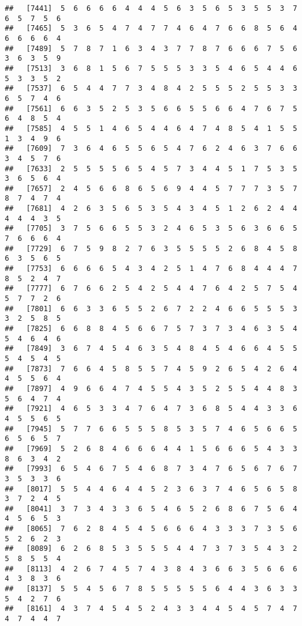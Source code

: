 \documentclass[
]{book}
\begin{document}
\begin{verbatim}
##   [7441]  5  6  6  6  6  4  4  4  5  6  3  5  6  5  3  5  5  3  7  6  5  7  5  6
##   [7465]  5  3  6  5  4  7  4  7  7  4  6  4  7  6  6  8  5  6  4  6  6  6  6  4
##   [7489]  5  7  8  7  1  6  3  4  3  7  7  8  7  6  6  6  7  5  6  3  6  3  5  9
##   [7513]  3  6  8  1  5  6  7  5  5  5  3  3  5  4  6  5  4  4  6  5  3  3  5  2
##   [7537]  6  5  4  4  7  7  3  4  8  4  2  5  5  5  2  5  5  3  3  6  5  7  4  6
##   [7561]  6  6  3  5  2  5  3  5  6  6  5  5  6  6  4  7  6  7  5  6  4  8  5  4
##   [7585]  4  5  5  1  4  6  5  4  4  6  4  7  4  8  5  4  1  5  5  1  3  4  9  6
##   [7609]  7  3  6  4  6  5  5  6  5  4  7  6  2  4  6  3  7  6  6  3  4  5  7  6
##   [7633]  2  5  5  5  5  6  5  4  5  7  3  4  4  5  1  7  5  3  5  3  6  5  6  4
##   [7657]  2  4  5  6  6  8  6  5  6  9  4  4  5  7  7  7  3  5  7  8  7  4  7  4
##   [7681]  4  2  6  3  5  6  5  3  5  4  3  4  5  1  2  6  2  4  4  4  4  4  3  5
##   [7705]  3  7  5  6  6  5  5  3  2  4  6  5  3  5  6  3  6  6  5  7  6  6  6  4
##   [7729]  6  7  5  9  8  2  7  6  3  5  5  5  5  2  6  8  4  5  8  6  3  5  6  5
##   [7753]  6  6  6  6  5  4  3  4  2  5  1  4  7  6  8  4  4  4  7  8  5  2  4  7
##   [7777]  6  7  6  6  2  5  4  2  5  4  4  7  6  4  2  5  7  5  4  5  7  7  2  6
##   [7801]  6  6  3  3  6  5  5  2  6  7  2  2  4  6  6  5  5  5  3  3  2  5  8  5
##   [7825]  6  6  8  8  4  5  6  6  7  5  7  3  7  3  4  6  3  5  4  5  4  6  4  6
##   [7849]  3  6  7  4  5  4  6  3  5  4  8  4  5  4  6  6  4  5  5  5  4  5  4  5
##   [7873]  7  6  6  4  5  8  5  5  7  4  5  9  2  6  5  4  2  6  4  4  5  5  6  4
##   [7897]  4  9  6  6  4  7  4  5  5  4  3  5  2  5  5  4  4  8  3  5  6  4  7  4
##   [7921]  4  6  5  3  3  4  7  6  4  7  3  6  8  5  4  4  3  3  6  4  5  5  6  5
##   [7945]  5  7  7  6  6  5  5  5  8  5  3  5  7  4  6  5  6  6  5  6  5  6  5  7
##   [7969]  5  2  6  8  4  6  6  6  4  4  1  5  6  6  6  5  4  3  3  8  6  3  4  2
##   [7993]  6  5  4  6  7  5  4  6  8  7  3  4  7  6  5  6  7  6  7  3  5  3  3  6
##   [8017]  5  5  4  4  6  4  4  5  2  3  6  3  7  4  6  5  6  5  8  3  7  2  4  5
##   [8041]  3  7  3  4  3  3  6  5  4  6  5  2  6  8  6  7  5  6  4  4  5  6  5  3
##   [8065]  7  6  2  8  4  5  4  5  6  6  6  4  3  3  3  7  3  5  6  5  2  6  2  3
##   [8089]  6  2  6  8  5  3  5  5  5  4  4  7  3  7  3  5  4  3  2  5  8  5  5  4
##   [8113]  4  2  6  7  4  5  7  4  3  8  4  3  6  6  3  5  6  6  6  4  3  8  3  6
##   [8137]  5  5  4  5  6  7  8  5  5  5  5  5  6  4  4  3  6  3  3  5  4  2  7  6
##   [8161]  4  3  7  4  5  4  5  2  4  3  3  4  4  5  4  5  7  4  7  4  7  4  4  7

\end{verbatim}
\end{document}
